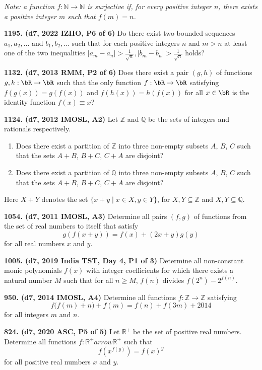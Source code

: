 \documentclass{article}
\begin{document}
\textit{Note: a function $f:\mathbb N\to\mathbb N$ is surjective if, for every positive integer $n$, there exists a positive integer $m$ such that $f(m)=n$.}

\textbf{1195. (\color{red}d7\color{black}, 2022 IZHO, P6 of 6)} Do there exist two bounded sequences $a_1,a_2,\dots $ and $b_1,b_2,\dots$ such that for each positive integers $n$ and $m>n$ at least one of the two inequalities $|a_m-a_n|>\frac{1}{\sqrt{n}}, |b_m-b_n|>\frac{1}{\sqrt{n}}$ holds?

\textbf{1132. (\color{red}d7\color{black}, 2013 RMM, P2 of 6)} Does there exist a pair $(g,h)$ of functions $g,h: \bR\to \bR$ such that the only function $f:\bR\to \bR$ satisfying $f(g(x))=g(f(x))$ and $f(h(x))=h(f(x))$ for all $x\in \bR$ is the identity function $f(x)\equiv x$?

\textbf{1124. (\color{red}d7\color{black}, 2012 IMOSL, A2)} Let $\mathbb{Z}$ and $\mathbb{Q}$ be the sets of integers and rationals respectively.
\begin{enumerate}
    \item Does there exist a partition of $\mathbb{Z}$ into three non-empty subsets $A$, $B$, $C$ such that the sets $A+B$, $B+C$, $C+A$ are disjoint?
    \item Does there exist a partition of $\mathbb{Q}$ into three non-empty subsets $A$, $B$, $C$ such that the sets $A+B$, $B+C$, $C+A$ are disjoint?
\end{enumerate}

Here $X+Y$ denotes the set $\{ x+y \mid x \in X, y \in Y \}$, for $X,Y \subseteq \mathbb{Z}$ and $X,Y \subseteq \mathbb{Q}$.

\textbf{1054. (\color{red}d7\color{black}, 2011 IMOSL, A3)} Determine all pairs $(f,g)$ of functions from the set of real numbers to itself that satisfy \[g(f(x+y)) = f(x) + (2x + y)g(y)\] for all real numbers $x$ and $y$.

\textbf{1005. (\color{red}d7\color{black}, 2019 India TST, Day 4, P1 of 3)} Determine all non-constant monic polynomials $f(x)$ with integer coefficients for which there exists a natural number $M$ such that for all $n \geq M$, $f(n)$ divides $f(2^n) - 2^{f(n)}$.

\textbf{950. (\color{red}d7\color{black}, 2014 IMOSL, A4)} Determine all functions $f: \mathbb{Z}\to\mathbb{Z}$ satisfying
\[ f\big(f(m)+n\big)+f(m)=f(n)+f(3m)+2014 \]
for all integers $m$ and $n$.




\textbf{824. (\color{red}d7\color{black}, 2020 ASC, P5 of 5)} Let $\mathbb{R}^{+}$ be the set of positive real numbers. Determine all functions $f: \mathbb{R}^{+} arrow \mathbb{R}^{+}$ such that $$ f(x^{f(y)})=f(x)^{y} $$ for all positive real numbers $x$ and $y$.
\end{document}
